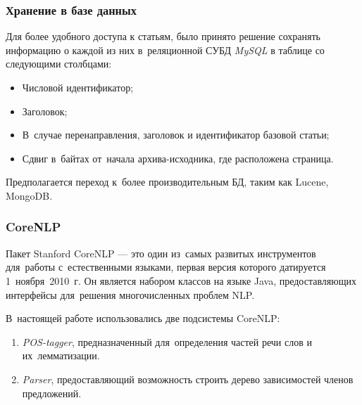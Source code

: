 \documentclass{beamer}
\begin{document}
\begin{frame}
\frametitle{Хранение в базе данных}

Для более удобного доступа к статьям,
было принято решение сохранять информацию о каждой из них 
в~реляционной СУБД \textit{MySQL} в таблице со следующими столбцами:

\begin{itemize}
\item{Числовой идентификатор;}
\item {Заголовок;}
\item {В~случае перенаправления, заголовок и идентификатор базовой статьи;}
\item {
Сдвиг в~байтах от~начала архива-исходника, 
где расположена страница.
}
\end{itemize}

Предполагается переход к~более производительным БД, 
таким как Lucene, MongoDB. 

\end{frame}

\begin{frame}
\frametitle{CoreNLP}
Пакет Stanford CoreNLP --- это один из~самых развитых инструментов для~работы с~естественными языками, 
первая версия которого датируется 1~ноября~2010~г.
Он является набором классов на языке Java, предоставляющих интерфейсы для~решения многочисленных проблем NLP. 

В~настоящей работе использовались две подсистемы CoreNLP:

\begin{enumerate}

\item {{\it POS-tagger}, предназначенный для~определения частей речи слов и их~лемматизации.}
\item {{\it Parser}, предоставляющий возможность строить дерево зависимостей членов предложений.}

\end{enumerate}

\end{frame}
\end{document}
